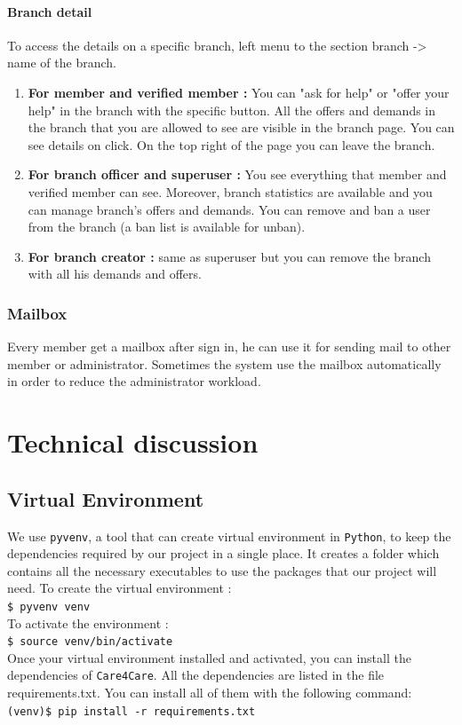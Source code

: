 \documentclass[11pt, a4paper]{article}   	%
\newcommand{\shellcmd}[1]{\\\indent\indent\texttt{\footnotesize\$ #1}\\}
\newcommand{\vshellcmd}[1]{\\\indent\indent\texttt{\footnotesize(venv)\$ #1}\\}
\begin{document}
\paragraph{Branch detail}
To access the details on a specific branch, left menu to the section branch -> name of the branch.
\begin{enumerate}
	\item \textbf{For member and verified member :} You can "ask for help" or "offer your help" in the branch with the specific button. All the offers and demands in the branch that you are allowed to see are visible in the branch page.
You can see details on click.
On the top right of the page you can leave the branch.
	\item \textbf{For branch officer and superuser :} You see everything that member and verified member can see. Moreover, branch statistics are available and you can manage branch's offers and demands. You can remove and ban a user from the branch (a ban list is available for unban).
	\item \textbf{For branch creator :} same as superuser but you can remove the branch with all his demands and offers.
\end{enumerate}

\subsubsection{Mailbox}

Every member get a mailbox after sign in, he can use it for sending mail to other member or administrator. Sometimes the system use the mailbox automatically in order to reduce the administrator workload.



\section{Technical discussion}

\subsection{Virtual Environment}

We use \texttt{pyvenv}, a tool that can create virtual environment in \texttt{Python}, to keep the dependencies required by our project in a single place. It creates a folder which contains all the necessary executables to use the packages that our project will need. To create the virtual environment :
\shellcmd{pyvenv venv}
To activate the environment :
\shellcmd{source venv/bin/activate}
Once your virtual environment installed and activated, you can install the dependencies of \texttt{Care4Care}. All the dependencies are listed in the file requirements.txt. You can install all of them with the following command:
\vshellcmd{pip install -r requirements.txt}
\end{document}
